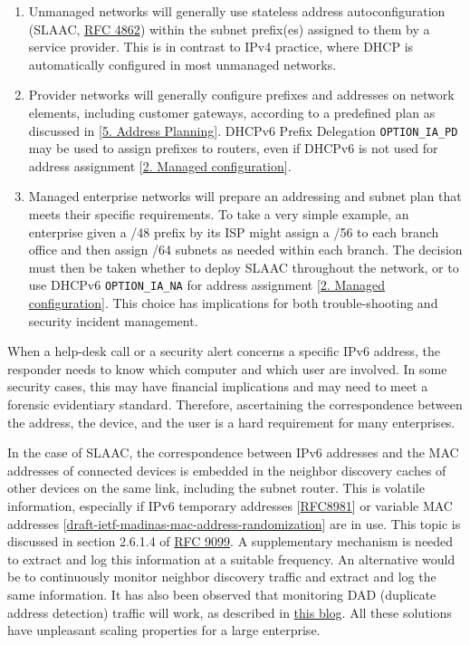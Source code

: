 \documentclass[
]{article}
\begin{document}
\begin{enumerate}
\def\labelenumi{\arabic{enumi}.}
\item
  Unmanaged networks will generally use stateless address
  autoconfiguration (SLAAC,
  \href{https://www.rfc-editor.org/info/rfc4862}{RFC 4862}) within the
  subnet prefix(es) assigned to them by a service provider. This is in
  contrast to IPv4 practice, where DHCP is automatically configured in
  most unmanaged networks.
\item
  Provider networks will generally configure prefixes and addresses on
  network elements, including customer gateways, according to a
  predefined plan as discussed in {[}\hyperref[address-planning]{5.
  Address Planning}{]}. DHCPv6 Prefix Delegation \texttt{OPTION\_IA\_PD}
  may be used to assign prefixes to routers, even if DHCPv6 is not used
  for address assignment {[}\hyperref[managed-configuration]{2. Managed
  configuration}{]}.
\item
  Managed enterprise networks will prepare an addressing and subnet plan
  that meets their specific requirements. To take a very simple example,
  an enterprise given a /48 prefix by its ISP might assign a /56 to each
  branch office and then assign /64 subnets as needed within each
  branch. The decision must then be taken whether to deploy SLAAC
  throughout the network, or to use DHCPv6 \texttt{OPTION\_IA\_NA} for
  address assignment {[}\hyperref[managed-configuration]{2. Managed
  configuration}{]}. This choice has implications for both
  trouble-shooting and security incident management.
\end{enumerate}

When a help-desk call or a security alert concerns a specific IPv6
address, the responder needs to know which computer and which user are
involved. In some security cases, this may have financial implications
and may need to meet a forensic evidentiary standard. Therefore,
ascertaining the correspondence between the address, the device, and the
user is a hard requirement for many enterprises.

In the case of SLAAC, the correspondence between IPv6 addresses and the
MAC addresses of connected devices is embedded in the neighbor discovery
caches of other devices on the same link, including the subnet router.
This is volatile information, especially if IPv6 temporary addresses
{[}\href{https://www.rfc-editor.org/info/rfc8981}{RFC8981}{]} or
variable MAC addresses
{[}\href{https://datatracker.ietf.org/doc/draft-ietf-madinas-mac-address-randomization/}{draft-ietf-madinas-mac-address-randomization}{]}
are in use. This topic is discussed in section 2.6.1.4 of
\href{https://www.rfc-editor.org/info/rfc9099}{RFC 9099}. A
supplementary mechanism is needed to extract and log this information at
a suitable frequency. An alternative would be to continuously monitor
neighbor discovery traffic and extract and log the same information. It
has also been observed that monitoring DAD (duplicate address detection)
traffic will work, as described in
\href{https://weberblog.net/monitoring-mac-ipv6-address-bindings/}{this
blog}. All these solutions have unpleasant scaling properties for a
large enterprise.
\end{document}
